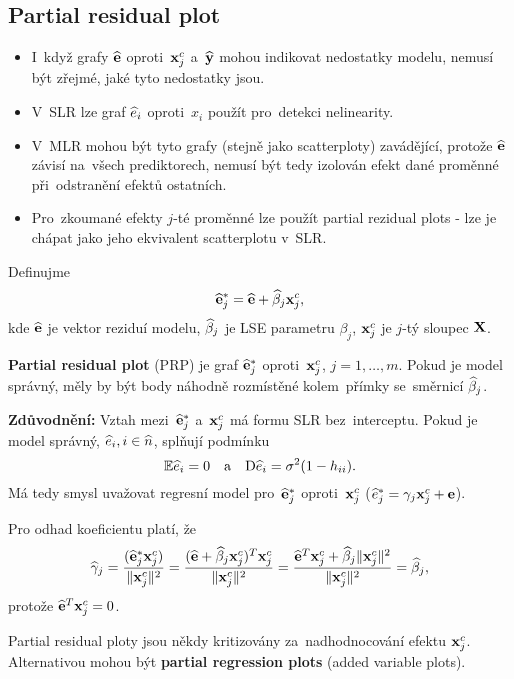 \subsection{Partial residual plot}
\begin{itemize}
\item I~když grafy $\widehat{\mathbf{e}}$ oproti~$\mathbf{x}_j^c$ a~$\widehat{\mathbf{y}}$ mohou indikovat nedostatky modelu, nemusí být zřejmé, jaké tyto nedostatky jsou.
\item V~SLR lze graf $\widehat{e}_i$ oproti~$x_i$ použít pro~detekci nelinearity.
\item V~MLR mohou být tyto grafy (stejně jako scatterploty) zavádějící, protože $\widehat{\mathbf{e}}$ závisí na~všech prediktorech, nemusí být tedy izolován efekt dané proměnné při~odstranění efektů ostatních.
\item Pro~zkoumané efekty $j$-té proměnné lze použít partial rezidual plots - lze je chápat jako jeho ekvivalent scatterplotu v~SLR.
\end{itemize}

\begin{define}
Definujme
$$
   \widehat{\mathbf{e}}_j^* = \widehat{\mathbf{e}} + \widehat{\beta}_j \mathbf{x}_j^c,
$$
 kde $\widehat{\mathbf{e}}$ je vektor reziduí modelu, $\widehat{\beta}_j$ je LSE parametru $\beta_j$, $\mathbf{x}_j^c$ je $j$-tý sloupec $\mathbf{X}$.
\end{define}

\textbf{Partial residual plot} (PRP) je graf $\widehat{\mathbf{e}}_j^*$ oproti~$\mathbf{x}_j^c$, $j = 1,\dots, m$. Pokud je model správný, měly by být body náhodně rozmístěné kolem~přímky se~směrnicí $\widehat{\beta}_j$.

\textbf{Zdůvodnění:} Vztah mezi~$\widehat{\mathbf{e}}_j^*$ a~$\mathbf{x}_j^c$ má formu SLR bez~interceptu. Pokud je model správný, $\widehat{e}_i, i\in\widehat{n} $, splňují podmínku
$$\mathbb{E} \widehat{e}_i = 0 \quad \text{a} \quad \mathrm{D} \widehat{e}_i = \sigma^2(1 - h_{ii}).$$
Má tedy smysl uvažovat regresní model pro~$\widehat{\mathbf{e}}_j^*$ oproti~$\mathbf{x}_j^c$ ($\widehat{e}_j^* = \gamma_j \mathbf{x}_j^c + \mathbf{e}$).

\newcommand{\hg}{\widehat{\gamma}}

Pro odhad koeficientu platí, že
 $$
\hg_j = \frac{(\heb_j^* \x_j^c)}{\norm{\x_j^c}^2} = \frac{(\heb + \wbeta_j \x_j^c)^T \x_j^c}{\norm{\x_j^c}^2} = \frac{\heb^T \x_j^c + \wbeta_j \norm{\x_j^c}^2}{\norm{\x_j^c}^2} = \wbeta_j,
 $$
protože $\widehat{\mathbf{e}}^T \mathbf{x}_j^c = 0$.


\newcommand{\wb}{\mathbf{w}}
\newcommand{\Xmj}{\X_{(-j)}}
\newcommand{\Xmi}{\X_{(-i)}}

\begin{remark}
	Partial residual ploty jsou někdy kritizovány za~nadhodnocování efektu $\mathbf{x}_j^c$. Alternativou mohou být \textbf{partial regression plots} (added variable plots).
\end{remark}


